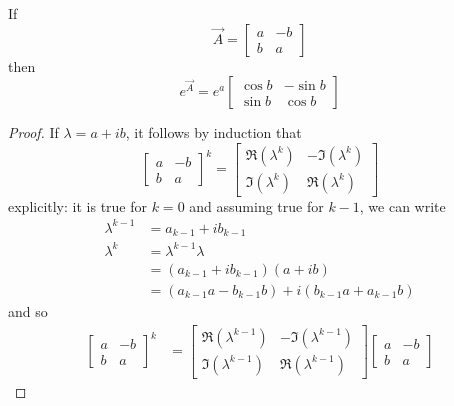 \begin{proposition}
	\label{prop:la:complex}
	If
	\begin{equation*}
		\vec A =
			\begin{bmatrix}
				a 	& -b \\
				b 	& a
			\end{bmatrix}
	\end{equation*}
	then
	\begin{equation*}
		e^{\vec A} = e^a
			\begin{bmatrix}
				\cos b 	& -\sin b \\
				\sin b 	& \cos b
			\end{bmatrix}
	\end{equation*}
\end{proposition}

\begin{proof}
	If $\lambda = a + ib$, it follows by induction that
	\begin{equation*}
		\begin{bmatrix}
			a & -b \\
			b & a
		\end{bmatrix}^k
		= 
		\begin{bmatrix}
			\Re(\lambda^k) & -\Im(\lambda^k) \\
			\Im(\lambda^k) & \Re(\lambda^k)
		\end{bmatrix}
	\end{equation*}
	explicitly: it is true for $k = 0$ and assuming true for $k - 1$, we can write
	\begin{align*}
		\lambda^{k - 1} &= a_{k - 1} + ib_{k - 1} \\
		\lambda^k 	&= \lambda^{k - 1} \lambda \\
					&= (a_{k - 1} + ib_{k - 1})(a + ib) \\
					&= (a_{k - 1}a - b_{k - 1}b) + i(b_{k - 1}a + a_{k - 1}b)
	\end{align*}
	and so
	\begin{align*}
		\begin{bmatrix}
			a & -b \\
			b & a
		\end{bmatrix}^k
		&=
		\begin{bmatrix}
			\Re(\lambda^{k - 1}) & -\Im(\lambda^{k - 1}) \\
			\Im(\lambda^{k - 1}) & \Re(\lambda^{k - 1})
		\end{bmatrix}
		\begin{bmatrix}
			a & -b \\
			b & a

\end{bmatrix}
\end{align*}
\end{proof}

